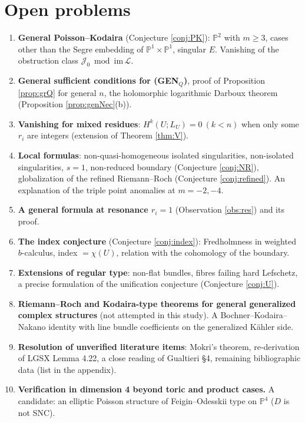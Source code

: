 \section{Open problems}\label{sec:open}
\begin{enumerate}
\item \textbf{General Poisson--Kodaira} (Conjecture \ref{conj:PK}): $\mathbb P^2$ with $m\ge3$, cases other than the Segre embedding of $\mathbb P^1\times\mathbb P^1$, singular $E$. Vanishing of the obstruction class $\mathcal J_0\bmod\mathrm{im}\,\mathcal L$.
\item \textbf{General sufficient conditions for (GEN$_Q$)}, proof of Proposition \ref{prop:grQ} for general $n$, the holomorphic logarithmic Darboux theorem (Proposition \ref{prop:genNec}(b)).
\item \textbf{Vanishing for mixed residues}: $H^k(U;L_U)=0\ (k<n)$ when only some $r_i$ are integers (extension of Theorem \ref{thm:V}).
\item \textbf{Local formulas}: non-quasi-homogeneous isolated singularities, non-isolated singularities, $s=1$, non-reduced boundary (Conjecture \ref{conj:NR}), globalization of the refined Riemann--Roch (Conjecture \ref{conj:refined}). An explanation of the triple point anomalies at $m=-2,-4$.
\item \textbf{A general formula at resonance $r_i=1$} (Observation \ref{obs:res}) and its proof.
\item \textbf{The index conjecture} (Conjecture \ref{conj:index}): Fredholmness in weighted $b$-calculus, index $=\chi(U)$, relation with the cohomology of the boundary.
\item \textbf{Extensions of regular type}: non-flat bundles, fibres failing hard Lefschetz, a precise formulation of the unification conjecture (Conjecture \ref{conj:U}).
\item \textbf{Riemann--Roch and Kodaira-type theorems for general generalized complex structures} (not attempted in this study). A Bochner--Kodaira--Nakano identity with line bundle coefficients on the generalized K\"ahler side.
\item \textbf{Resolution of unverified literature items}: Mokri's theorem, re-derivation of LGSX Lemma 4.22, a close reading of Gualtieri \cite{Gua11} \S4, remaining bibliographic data (list in the appendix).
\item \textbf{Verification in dimension 4 beyond toric and product cases.} A candidate: an elliptic Poisson structure of Feigin--Odesskii type on $\mathbb P^4$ ($D$ is not SNC).
\end{enumerate}
